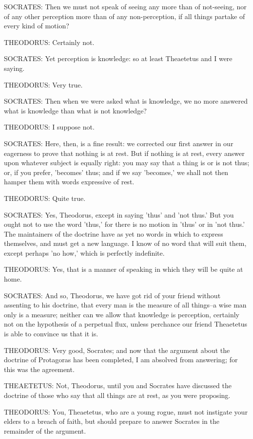 SOCRATES: Then we must not speak of seeing any more than of not-seeing,
nor of any other perception more than of any non-perception, if all
things partake of every kind of motion?

THEODORUS: Certainly not.

SOCRATES: Yet perception is knowledge: so at least Theaetetus and I were
saying.

THEODORUS: Very true.

SOCRATES: Then when we were asked what is knowledge, we no more answered
what is knowledge than what is not knowledge?

THEODORUS: I suppose not.

SOCRATES: Here, then, is a fine result: we corrected our first answer
in our eagerness to prove that nothing is at rest. But if nothing is at
rest, every answer upon whatever subject is equally right: you may say
that a thing is or is not thus; or, if you prefer, 'becomes' thus; and
if we say 'becomes,' we shall not then hamper them with words expressive
of rest.

THEODORUS: Quite true.

SOCRATES: Yes, Theodorus, except in saying 'thus' and 'not thus.' But
you ought not to use the word 'thus,' for there is no motion in 'thus'
or in 'not thus.' The maintainers of the doctrine have as yet no words
in which to express themselves, and must get a new language. I know of
no word that will suit them, except perhaps 'no how,' which is perfectly
indefinite.

THEODORUS: Yes, that is a manner of speaking in which they will be quite
at home.

SOCRATES: And so, Theodorus, we have got rid of your friend without
assenting to his doctrine, that every man is the measure of all
things--a wise man only is a measure; neither can we allow that
knowledge is perception, certainly not on the hypothesis of a perpetual
flux, unless perchance our friend Theaetetus is able to convince us that
it is.

THEODORUS: Very good, Socrates; and now that the argument about the
doctrine of Protagoras has been completed, I am absolved from answering;
for this was the agreement.

THEAETETUS: Not, Theodorus, until you and Socrates have discussed the
doctrine of those who say that all things are at rest, as you were
proposing.

THEODORUS: You, Theaetetus, who are a young rogue, must not instigate
your elders to a breach of faith, but should prepare to answer Socrates
in the remainder of the argument.

